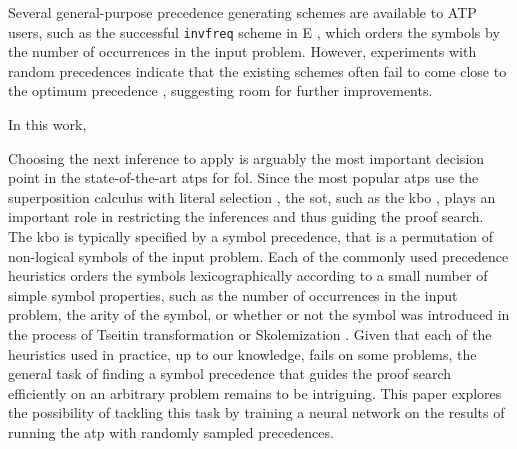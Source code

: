 
Several general-purpose precedence generating schemes are available to ATP users,
such as the successful \texttt{invfreq} scheme in E \cite{E-manual}, which orders the symbols 
by the number of occurrences in the input problem. However, experiments with random precedences
indicate that the existing schemes often fail to come close to the optimum precedence \cite{RegerSuda2017},
suggesting room for further improvements.

In this work, 

\newpage









Choosing the next inference to apply is arguably the most important decision point in the state-of-the-art
\glspl{atp} for \gls{fol}.
Since the most popular \glspl{atp} use the superposition calculus with literal selection \cite{DBLP:journals/logcom/BachmairG94},
the \gls{sot}, such as the \gls{kbo} \cite{Knuth1983},
plays an important role in restricting the inferences and thus guiding the proof search.
The \gls{kbo} is typically specified by a symbol precedence,
that is a permutation of non-logical symbols of the input problem.
Each of the commonly used precedence heuristics orders the symbols
lexicographically according to a small number of simple
symbol properties,
such as the number of occurrences in the input problem,
the arity of the symbol, or
whether or not the symbol was introduced in the process of Tseitin transformation \cite{Tseitin1983} or Skolemization \cite{Harrison2009}.
Given that each of the heuristics used in practice, up to our knowledge, fails on some problems,
the general task of
finding a symbol precedence that guides the proof search efficiently on an arbitrary problem
remains to be intriguing.
This paper explores the possibility of tackling this task by training a neural network
on the results of running the \gls{atp} \Vampire{} \cite{10.1007/978-3-642-39799-8_1} with randomly sampled precedences.

